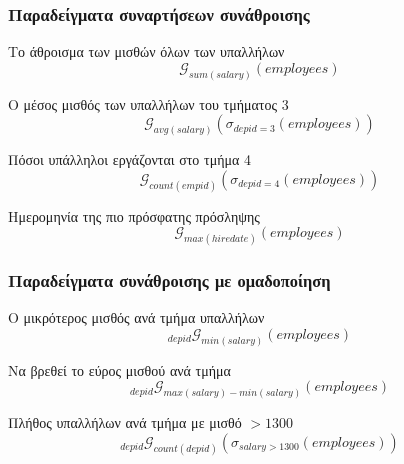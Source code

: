 


\begin{frame}
\frametitle{Παραδείγματα συναρτήσεων συνάθροισης}
\begin{minipage}{\wE}
  \begin{exampleblock}{Το άθροισμα των μισθών όλων των υπαλλήλων}
    \[ \mathcal{G}_{sum(salary)} (employees) \]
  \end{exampleblock}
    \begin{exampleblock}{Ο μέσος μισθός των υπαλλήλων του τμήματος 3}
    \[ \mathcal{G}_{avg(salary)} ( \sigma_{depid=3} (employees) ) \]
  \end{exampleblock}
  \begin{exampleblock}{Πόσοι υπάλληλοι εργάζονται στο τμήμα 4}
    \[ \mathcal{G}_{count(empid)} ( \sigma_{depid=4} (employees) ) \]
  \end{exampleblock}
  \begin{exampleblock}{Ημερομηνία της πιο πρόσφατης πρόσληψης}
    \[ \mathcal{G}_{max(hiredate)} (employees) \]
  \end{exampleblock}    
\end{minipage}
\end{frame}


\begin{frame}
\frametitle{Παραδείγματα συνάθροισης με ομαδοποίηση}
\begin{minipage}{\wE}
  \begin{exampleblock}{Ο μικρότερος μισθός ανά τμήμα υπαλλήλων}
    \[ {}_{depid} \mathcal{G}_{min(salary)} (employees) \]
  \end{exampleblock}
  \begin{exampleblock}{Να βρεθεί το εύρος μισθού ανά τμήμα}
    \[ {}_{depid} \mathcal{G}_{max(salary)-min(salary)}  (employees) \]
  \end{exampleblock}
  \begin{exampleblock}{Πλήθος υπαλλήλων ανά τμήμα με μισθό $>1300$}
    \[ {}_{depid} \mathcal{G}_{count(depid)}
       \left(
         \sigma_{salary>1300} (employees)
       \right) 
    \]
  \end{exampleblock}    
\end{minipage}
\end{frame}


